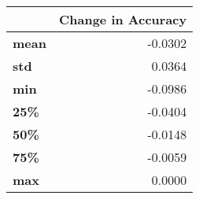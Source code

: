 \begin{tabular}{lr}
\toprule
{} &  Change in Accuracy \\
\midrule
\textbf{mean} &             -0.0302 \\
\textbf{std } &              0.0364 \\
\textbf{min } &             -0.0986 \\
\textbf{25\% } &             -0.0404 \\
\textbf{50\% } &             -0.0148 \\
\textbf{75\% } &             -0.0059 \\
\textbf{max } &              0.0000 \\
\bottomrule
\end{tabular}
